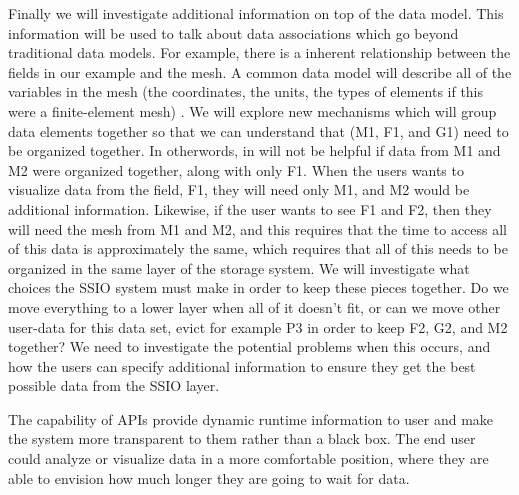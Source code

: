 Finally we will investigate additional information on top of the data model. This information will be used to talk about data associations which go
beyond traditional data models. For example, there is a inherent relationship between the fields in our example and the mesh. A common data model
will describe all of the variables in the mesh (the coordinates, the units, the types of elements if this were a finite-element mesh) . We will explore
new mechanisms which will group data elements together so that we can understand that (M1, F1, and G1) need to be organized together. 
In otherwords, in will not be helpful if data from M1 and M2 were organized together, along with only F1. When the users wants to visualize data from 
the field, F1, they will need only M1, and M2 would be additional information. Likewise, if the user wants to see F1 and F2, then they will need the
mesh from M1 and M2, and this requires that the time to access all of this data is approximately the same, which requires that all of this needs
to be organized in the same layer of the storage system.  We will investigate what choices the SSIO system must make in order to keep these
pieces together. Do we move everything to a lower layer when all of it doesn't fit, or can we move other user-data for this data set, evict for example
P3 in order to keep F2, G2, and M2 together? We need to investigate the potential problems when this occurs, and how the users can specify
additional information to ensure they get the best possible data from the SSIO layer.


The capability of APIs provide dynamic runtime information to user and make the system 
more transparent to them rather than a black box. The end user could analyze or visualize data 
in a more comfortable position, where they are able to envision 
how much longer they are going to wait for data. 


